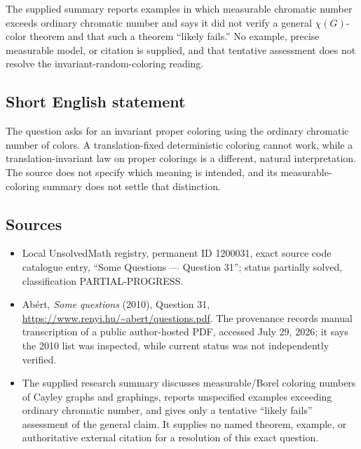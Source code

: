 \documentclass[11pt]{article}
\begin{document}
The supplied summary reports examples in which measurable chromatic number exceeds ordinary chromatic number and says it did not verify a general $\chi(G)$-color theorem and that such a theorem ``likely fails.'' No example, precise measurable model, or citation is supplied, and that tentative assessment does not resolve the invariant-random-coloring reading.
\subsection{Short English statement}
The question asks for an invariant proper coloring using the ordinary chromatic number of colors. A translation-fixed deterministic coloring cannot work, while a translation-invariant law on proper colorings is a different, natural interpretation. The source does not specify which meaning is intended, and its measurable-coloring summary does not settle that distinction.
\subsection{Sources}
\begin{itemize}
\item Local UnsolvedMath registry, permanent ID 1200031, exact source code catalogue entry, ``Some Questions --- Question 31''; status partially solved, classification PARTIAL-PROGRESS.
\item Ab\'ert, \emph{Some questions} (2010), Question 31, \url{https://www.renyi.hu/~abert/questions.pdf}. The provenance records manual transcription of a public author-hosted PDF, accessed July 29, 2026; it says the 2010 list was inspected, while current status was not independently verified.
\item The supplied research summary discusses measurable/Borel coloring numbers of Cayley graphs and graphings, reports unspecified examples exceeding ordinary chromatic number, and gives only a tentative ``likely fails'' assessment of the general claim. It supplies no named theorem, example, or authoritative external citation for a resolution of this exact question.
\end{itemize}
\end{document}
